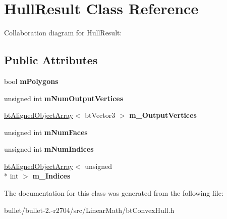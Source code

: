 \hypertarget{class_hull_result}{\section{Hull\+Result Class Reference}
\label{class_hull_result}
}


Collaboration diagram for Hull\+Result\+:
\subsection*{Public Attributes}
\begin{DoxyCompactItemize}
\item 
\hypertarget{class_hull_result_ac0a9404ad0ba8c0cddf41950684412bc}{bool {\bfseries m\+Polygons}}\label{class_hull_result_ac0a9404ad0ba8c0cddf41950684412bc}

\item 
\hypertarget{class_hull_result_aa31d0601990e10f7a9c0d991dffac859}{unsigned int {\bfseries m\+Num\+Output\+Vertices}}\label{class_hull_result_aa31d0601990e10f7a9c0d991dffac859}

\item 
\hypertarget{class_hull_result_a2a0f200c20f765e2f1b54ca5e06f6eec}{\hyperlink{classbt_aligned_object_array}{bt\+Aligned\+Object\+Array}$<$ bt\+Vector3 $>$ {\bfseries m\+\_\+\+Output\+Vertices}}\label{class_hull_result_a2a0f200c20f765e2f1b54ca5e06f6eec}

\item 
\hypertarget{class_hull_result_ab20683ae46c0a29c0a0b34fe78474f9a}{unsigned int {\bfseries m\+Num\+Faces}}\label{class_hull_result_ab20683ae46c0a29c0a0b34fe78474f9a}

\item 
\hypertarget{class_hull_result_aef8ad7452c3e0eb2c5d4330191e19122}{unsigned int {\bfseries m\+Num\+Indices}}\label{class_hull_result_aef8ad7452c3e0eb2c5d4330191e19122}

\item 
\hypertarget{class_hull_result_a88737bb44864daed86f058f338ba0a8e}{\hyperlink{classbt_aligned_object_array}{bt\+Aligned\+Object\+Array}$<$ unsigned \\*
int $>$ {\bfseries m\+\_\+\+Indices}}\label{class_hull_result_a88737bb44864daed86f058f338ba0a8e}

\end{DoxyCompactItemize}


The documentation for this class was generated from the following file\+:\begin{DoxyCompactItemize}
\item 
bullet/bullet-\/2.-\/r2704/src/\+Linear\+Math/bt\+Convex\+Hull.\+h\end{DoxyCompactItemize}
